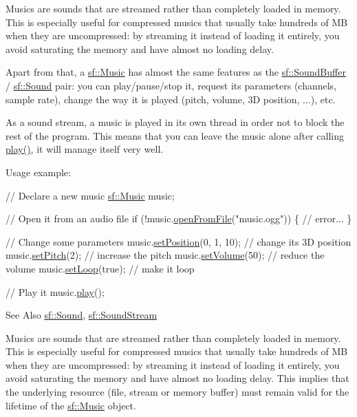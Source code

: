 Musics are sounds that are streamed rather than completely loaded in memory. This is especially useful for compressed musics that usually take hundreds of M\-B when they are uncompressed\-: by streaming it instead of loading it entirely, you avoid saturating the memory and have almost no loading delay.

Apart from that, a \hyperlink{classsf_1_1_music}{sf\-::\-Music} has almost the same features as the \hyperlink{classsf_1_1_sound_buffer}{sf\-::\-Sound\-Buffer} / \hyperlink{classsf_1_1_sound}{sf\-::\-Sound} pair\-: you can play/pause/stop it, request its parameters (channels, sample rate), change the way it is played (pitch, volume, 3\-D position, ...), etc.

As a sound stream, a music is played in its own thread in order not to block the rest of the program. This means that you can leave the music alone after calling \hyperlink{classsf_1_1_sound_stream_afdc08b69cab5f243d9324940a85a1144}{play()}, it will manage itself very well.

Usage example\-: 
\begin{DoxyCode}
\textcolor{comment}{// Declare a new music}
\hyperlink{classsf_1_1_music}{sf::Music} music;

\textcolor{comment}{// Open it from an audio file}
\textcolor{keywordflow}{if} (!music.\hyperlink{classsf_1_1_music_a3edc66e5f5b3f11e84b90eaec9c7d7c0}{openFromFile}(\textcolor{stringliteral}{"music.ogg"}))
\{
    \textcolor{comment}{// error...}
\}

\textcolor{comment}{// Change some parameters}
music.\hyperlink{classsf_1_1_sound_source_a0480257ea25d986eba6cc3c1a6f8d7c2}{setPosition}(0, 1, 10); \textcolor{comment}{// change its 3D position}
music.\hyperlink{classsf_1_1_sound_source_a72a13695ed48b7f7b55e7cd4431f4bb6}{setPitch}(2);           \textcolor{comment}{// increase the pitch}
music.\hyperlink{classsf_1_1_sound_source_a2f192f2b49fb8e2b82f3498d3663fcc2}{setVolume}(50);         \textcolor{comment}{// reduce the volume}
music.\hyperlink{classsf_1_1_sound_stream_a43fade018ffba7e4f847a9f00b353f3d}{setLoop}(\textcolor{keyword}{true});         \textcolor{comment}{// make it loop}

\textcolor{comment}{// Play it}
music.\hyperlink{classsf_1_1_sound_stream_afdc08b69cab5f243d9324940a85a1144}{play}();
\end{DoxyCode}


\begin{DoxySeeAlso}{See Also}
\hyperlink{classsf_1_1_sound}{sf\-::\-Sound}, \hyperlink{classsf_1_1_sound_stream}{sf\-::\-Sound\-Stream}
\end{DoxySeeAlso}
Musics are sounds that are streamed rather than completely loaded in memory. This is especially useful for compressed musics that usually take hundreds of M\-B when they are uncompressed\-: by streaming it instead of loading it entirely, you avoid saturating the memory and have almost no loading delay. This implies that the underlying resource (file, stream or memory buffer) must remain valid for the lifetime of the \hyperlink{classsf_1_1_music}{sf\-::\-Music} object.

